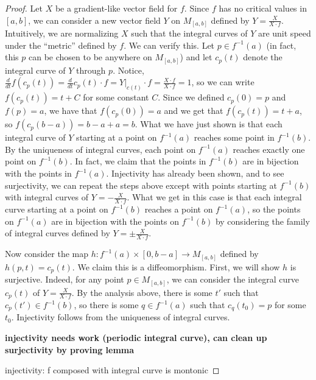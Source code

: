 \documentclass[12pt]{article}
\begin{document}
\begin{proof}
      Let $X$ be a gradient-like vector field for $f$. Since $f$ has no critical values in $[a,b]$, we can consider a new vector field $Y$ on $M_{[a,b]}$ defined by $Y = \frac{X}{X\cdot f}$. Intuitively, we are normalizing $X$ such that the integral curves of $Y$ are unit speed under the ``metric'' defined by $f$. We can verify this. Let $p \in f^{-1}(a)$ (in fact, this $p$ can be chosen to be anywhere on $M_{[a,b]}$) and let $c_p(t)$ denote the integral curve of $Y$ through $p$. Notice, $\frac{d}{dt}f(c_p(t)) = \frac{d}{dt}c_p(t)\cdot f = Y|_{c(t)}\cdot f = \frac{X\cdot f}{X \cdot f} = 1$, so we can write $f(c_p(t)) = t + C$ for some constant $C$. Since we defined $c_p(0) = p$ and $f(p)=a$, we have that $f(c_p(0)) =a $ and we get that $f(c_p(t))=t+a$, so $f(c_p(b-a)) = b-a+a = b$. What we have just shown is that each integral curve of $Y$ starting at a point on $f^{-1}(a)$ reaches some point in $f^{-1}(b)$. By the uniqueness of integral curves, each point on $f^{-1}(a)$ reaches exactly one point on $f^{-1}(b)$. In fact, we claim that the points in $f^{-1}(b)$ are in bijection with the points in $f^{-1}(a)$. Injectivity has already been shown, and to see surjectivity, we can repeat the steps above except with points starting at $f^{-1}(b)$ with integral curves of $Y = -\frac{X}{X\cdot f}$. What we get in this case is that each integral curve starting at a point on $f^{-1}(b)$ reaches a point on $f^{-1}(a)$, so the points on $f^{-1}(a)$ are in bijection with the points on $f^{-1}(b)$ by considering the family of integral curves defined by $Y = \pm\frac{X}{X\cdot f}$.

      Now consider the map $h:f^{-1}(a)\times [0,b-a] \rightarrow M_{[a,b]}$ defined by $h(p,t) = c_p(t)$. We claim this is a diffeomorphism. First, we will show $h$ is surjective. Indeed, for any point $p \in M_{[a,b]}$, we can consider the integral curve $c_p(t)$ of $Y = \frac{X}{X\cdot f}$. By the analysis above, there is some $t'$ such that $c_p(t') \in f^{-1}(b)$, so there is some $q \in f^{-1}(a)$ such that $c_q(t_0)=p$ for some $t_0$. Injectivity follows from the uniqueness of integral curves. 


      \textbf{injectivity needs work (periodic integral curve), can clean up surjectivity by proving lemma}

      injectivity: f composed with integral curve is montonic

\end{proof}
\end{document}
